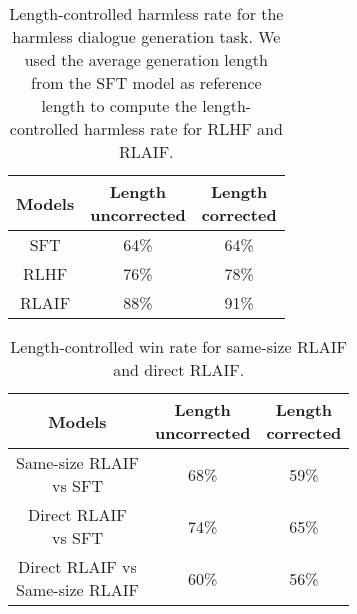 \documentclass[11pt]{article}
\begin{document}
\begin{table}[ht]
\centering

\begin{tabular}{|c|c|c|}
\hline
Models         & \makecell{Length \\ uncorrected} & \makecell{Length \\ corrected} \\\hline
SFT   & 64\%               & 64\%             \\ \hline
RLHF  & 76\%               & 78\%             \\ \hline
RLAIF & 88\%               & 91\%             \\ \hline
\end{tabular}

\caption{Length-controlled harmless rate for the harmless dialogue generation task. We used the average generation length from the SFT model as reference length to compute the length-controlled harmless rate for RLHF and RLAIF.}
\label{tab:anthropic-harmless}
\end{table}



\begin{table}[ht]
\centering

\begin{tabular}{|c|c|c|}
\hline
Models         & \makecell{Length \\ uncorrected} & \makecell{Length \\ corrected} \\\hline
\makecell{Same-size RLAIF \\ vs SFT}  & 68\%               & 59\%             \\\hline
\makecell{Direct RLAIF \\ vs SFT}  & 74\%               & 65\%             \\\hline
\makecell{Direct RLAIF vs \\ Same-size RLAIF}  & 60\%               & 56\%             \\\hline
\end{tabular}

\caption{Length-controlled win rate for same-size RLAIF and direct RLAIF.}
\label{tab:self-improvement}
\end{table}
\end{document}
